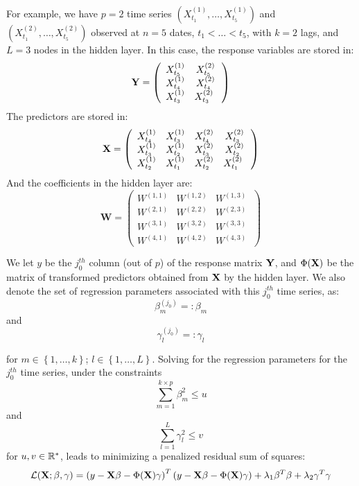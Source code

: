 For example, we have $p = 2$ time series $(X^{(1)}_{t_1}, \ldots,  X^{(1)}_{t_5})$ and $(X^{(2)}_{t_1}, \ldots,  X^{(2)}_{t_5})$ observed at $n = 5$ dates, $t_1 < \ldots < t_5$, with $k = 2$ lags, and $L = 3$ nodes in the hidden layer. In this case, the response variables are stored in:
$$
{\bf Y} = \left( {\begin{array}{cc} X^{(1)}_{t_5} &  X^{(2)}_{t_5}\\ X^{(1)}_{t_4} & X^{(2)}_{t_4} \\ X^{(1)}_{t_3} & X^{(2)}_{t_3}\      \end{array} } \right)
$$
The predictors are stored in:
$$
{\bf X} = \left( {\begin{array}{cccc} X^{(1)}_{t_4} & X^{(1)}_{t_3} & X^{(2)}_{t_4} & X^{(2)}_{t_3} \\ X^{(1)}_{t_3} & X^{(1)}_{t_2} & X^{(2)}_{t_3} & X^{(2)}_{t_2} \\ X^{(1)}_{t_2} & X^{(1)}_{t_1} & X^{(2)}_{t_2} & X^{(2)}_{t_1} \      \end{array} }\right)
$$
And the coefficients in the hidden layer are:
$$
\textbf{W} = \left( {\begin{array}{ccc} W^{(1, 1)} & W^{(1, 2)} & W^{(1, 3)}  \\ W^{(2, 1)} & W^{(2, 2)} & W^{(2, 3)}  \\ W^{(3, 1)} & W^{(3, 2)} & W^{(3, 3)} \\ W^{(4, 1)} & W^{(4, 2)} & W^{(4, 3)}  \      \end{array} }\right)
$$

\medskip

We let $y$ be the $j_0^{th}$ column (out of $p$) of the response matrix ${\bf Y}$, and $\Phi({\bf X})$ be the matrix of transformed predictors obtained from ${\bf X}$ by the hidden layer. We also denote the set of regression parameters associated with this $j_0^{th}$ time series, as:
$$
\beta_m^{(j_0)} =: \beta_m
$$
and
$$
\gamma_l^{(j_0)} =: \gamma_l
$$

for $m \in \left\lbrace 1, \ldots, k \right\rbrace$; $l \in \left\lbrace 1, \ldots,  L\right\rbrace$. Solving for the regression parameters for the $j_0^{th}$ time series, under the constraints
$$
\sum_{m=1}^{k\times p} \beta_m^2 \leq u
$$
and
$$
\sum_{l=1}^L \gamma_l^2 \leq v
$$
for $u, v \in \mathbb{R}^*$, leads to minimizing a penalized residual sum of squares:
$$
\mathcal{L}({\bf X}; \beta, \gamma) = \left(y - {\bf X}\beta -
\Phi({\bf X})\gamma\right)^T\left(y - {\bf X}\beta - \Phi({\bf X})\gamma\right) + \lambda_1
\beta^T \beta + \lambda_2 \gamma^T\gamma
$$

